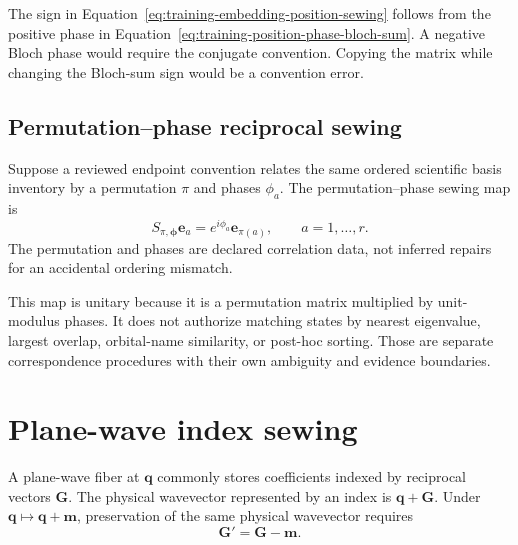The sign in Equation~\eqref{eq:training-embedding-position-sewing} follows from
the positive phase in
Equation~\eqref{eq:training-position-phase-bloch-sum}. A negative Bloch phase
would require the conjugate convention. Copying the matrix while changing the
Bloch-sum sign would be a convention error.

\subsection{Permutation--phase reciprocal sewing}

\begin{definition}
\label{def:training-permutation-phase-sewing}
Suppose a reviewed endpoint convention relates the same ordered scientific
basis inventory by a permutation \(\pi\) and phases \(\phi_a\). The
permutation--phase sewing map is
\begin{equation}
  S_{\pi,\boldsymbol\phi}\mathbf e_a
  =e^{i\phi_a}\mathbf e_{\pi(a)},
  \qquad a=1,\ldots,r.
  \label{eq:training-permutation-phase-sewing}
\end{equation}
The permutation and phases are declared correlation data, not inferred repairs
for an accidental ordering mismatch.
\end{definition}

This map is unitary because it is a permutation matrix multiplied by unit-modulus
phases. It does not authorize matching states by nearest eigenvalue, largest
overlap, orbital-name similarity, or post-hoc sorting. Those are separate
correspondence procedures with their own ambiguity and evidence boundaries.

\section{Plane-wave index sewing}

A plane-wave fiber at \(\mathbf q\) commonly stores coefficients indexed by
reciprocal vectors \(\mathbf G\). The physical wavevector represented by an
index is \(\mathbf q+\mathbf G\). Under
\(\mathbf q\mapsto\mathbf q+\mathbf m\), preservation of the same physical
wavevector requires
\begin{equation}
  \mathbf G' = \mathbf G-\mathbf m.
  \label{eq:training-plane-wave-index-shift}
\end{equation}

